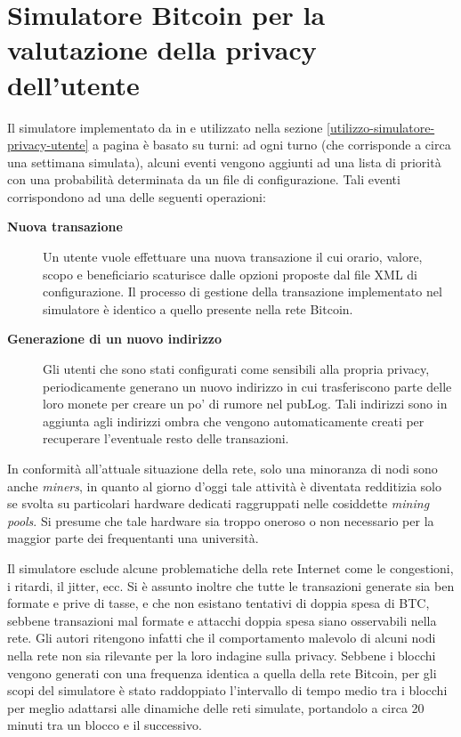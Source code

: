 \chapter{Simulatore Bitcoin per la valutazione della privacy dell'utente}

Il simulatore implementato da in \cite{user-privacy} e utilizzato nella sezione \ref{utilizzo-simulatore-privacy-utente} a pagina \pageref{utilizzo-simulatore-privacy-utente} è basato su turni: ad ogni turno (che corrisponde a circa una settimana simulata), alcuni eventi vengono aggiunti ad una lista di priorità con una probabilità determinata da un file di configurazione.
Tali eventi corrispondono ad una delle seguenti operazioni:

\begin{description}
    \item[\textbf{Nuova transazione}]
      Un utente vuole effettuare una nuova transazione il cui orario, valore, scopo e beneficiario scaturisce dalle opzioni proposte dal file XML di configurazione. Il processo di gestione della transazione implementato nel simulatore è identico a quello presente nella rete Bitcoin.
    \item[\textbf{Generazione di un nuovo indirizzo}]
      Gli utenti che sono stati configurati come sensibili alla propria privacy, periodicamente generano un nuovo indirizzo in cui trasferiscono parte delle loro monete per creare un po' di rumore nel pubLog. Tali indirizzi sono in aggiunta agli indirizzi ombra che vengono automaticamente creati per recuperare l'eventuale resto delle transazioni.
\end{description}

In conformità all'attuale situazione della rete, solo una minoranza di nodi sono anche \emph{miners}, in quanto al giorno d'oggi tale attività è diventata redditizia solo se svolta su particolari hardware dedicati raggruppati nelle cosiddette \emph{mining pools}. Si presume che tale hardware sia troppo oneroso o non necessario per la maggior parte dei frequentanti una università.

Il simulatore esclude alcune problematiche della rete Internet come le congestioni, i ritardi, il jitter, ecc.
Si è assunto inoltre che tutte le transazioni generate sia ben formate e prive di tasse, e che non esistano tentativi di doppia spesa di BTC, sebbene transazioni mal formate e attacchi doppia spesa siano osservabili nella rete.
Gli autori ritengono infatti che il comportamento malevolo di alcuni nodi nella rete non sia rilevante per la loro indagine sulla privacy.
Sebbene i blocchi vengono generati con una frequenza identica a quella della rete Bitcoin, per gli scopi del simulatore è stato raddoppiato l'intervallo di tempo medio tra i blocchi per meglio adattarsi alle dinamiche delle reti simulate, portandolo a circa 20 minuti tra un blocco e il successivo.
